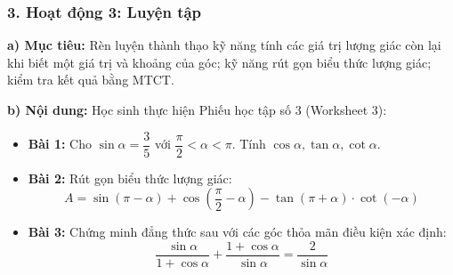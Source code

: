 \documentclass[12pt, a4paper]{article}
\begin{document}
\subsubsection*{3. Hoạt động 3: Luyện tập}
\textbf{a) Mục tiêu:} Rèn luyện thành thạo kỹ năng tính các giá trị lượng giác còn lại khi biết một giá trị và khoảng của góc; kỹ năng rút gọn biểu thức lượng giác; kiểm tra kết quả bằng MTCT.

\textbf{b) Nội dung:} Học sinh thực hiện Phiếu học tập số 3 (Worksheet 3):
\begin{itemize}[leftmargin=0.6cm]
    \item \textbf{Bài 1:} Cho $\sin\alpha = \dfrac{3}{5}$ với $\dfrac{\pi}{2} < \alpha < \pi$. Tính $\cos\alpha, \tan\alpha, \cot\alpha$.
    \item \textbf{Bài 2:} Rút gọn biểu thức lượng giác:
    $$A = \sin(\pi - \alpha) + \cos\left(\dfrac{\pi}{2} - \alpha\right) - \tan(\pi + \alpha) \cdot \cot(-\alpha)$$
    \item \textbf{Bài 3:} Chứng minh đẳng thức sau với các góc thỏa mãn điều kiện xác định:
    $$\dfrac{\sin\alpha}{1 + \cos\alpha} + \dfrac{1 + \cos\alpha}{\sin\alpha} = \dfrac{2}{\sin\alpha}$$
\end{itemize}
\end{document}
